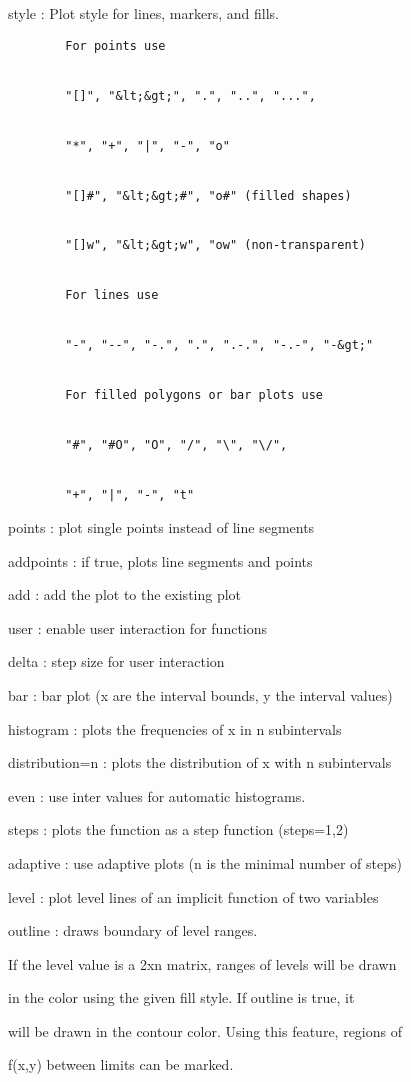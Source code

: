 \documentclass[
]{book}
\begin{document}
style : Plot style for lines, markers, and fills.

\begin{verbatim}
        For points use


        "[]", "&lt;&gt;", ".", "..", "...",


        "*", "+", "|", "-", "o"


        "[]#", "&lt;&gt;#", "o#" (filled shapes)


        "[]w", "&lt;&gt;w", "ow" (non-transparent)


        For lines use


        "-", "--", "-.", ".", ".-.", "-.-", "-&gt;"


        For filled polygons or bar plots use


        "#", "#O", "O", "/", "\", "\/",


        "+", "|", "-", "t"
\end{verbatim}

points : plot single points instead of line segments

addpoints : if true, plots line segments and points

add : add the plot to the existing plot

user : enable user interaction for functions

delta : step size for user interaction

bar : bar plot (x are the interval bounds, y the interval values)

histogram : plots the frequencies of x in n subintervals

distribution=n : plots the distribution of x with n subintervals

even : use inter values for automatic histograms.

steps : plots the function as a step function (steps=1,2)

adaptive : use adaptive plots (n is the minimal number of steps)

level : plot level lines of an implicit function of two variables

outline : draws boundary of level ranges.

If the level value is a 2xn matrix, ranges of levels will be drawn

in the color using the given fill style. If outline is true, it

will be drawn in the contour color. Using this feature, regions of

f(x,y) between limits can be marked.
\end{document}
